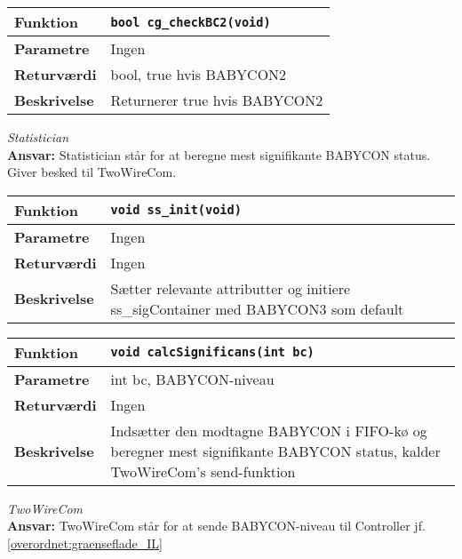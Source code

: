 \begin{center}
    \begin{tabular}{ | l | p{} |}
    \hline
    \textbf{Funktion}	& \verb+bool cg_checkBC2(void) +						\\ \hline
    \textbf{Parametre} 	& Ingen 								\\ \hline
    \textbf{Returværdi}	& bool, true hvis BABYCON2 	 								\\ \hline
    \textbf{Beskrivelse}& Returnerer true hvis BABYCON2		\\ \hline
    \end{tabular}
\end{center}



\textit{Statistician} \\
\textbf{Ansvar:} Statistician står for at beregne mest signifikante BABYCON status. Giver besked til TwoWireCom. 

\begin{center}
    \begin{tabular}{ | l | p{} |}
    \hline
    \textbf{Funktion}	& \verb+void ss_init(void) +						\\ \hline
    \textbf{Parametre} 	& Ingen		\\ \hline
    \textbf{Returværdi}	& Ingen	 								\\ \hline
    \textbf{Beskrivelse}& Sætter relevante attributter og initiere ss\_sigContainer med BABYCON3 som default	\\ \hline
    \end{tabular}
\end{center}

\begin{center}
    \begin{tabular}{ | l | p{} |}
    \hline
    \textbf{Funktion}	& \verb+void calcSignificans(int bc) +						\\ \hline
    \textbf{Parametre} 	& int bc, BABYCON-niveau		\\ \hline
    \textbf{Returværdi}	& Ingen	 								\\ \hline
    \textbf{Beskrivelse}& Indsætter den modtagne BABYCON i FIFO-kø og beregner mest signifikante BABYCON status, kalder TwoWireCom's send-funktion		\\ \hline
    \end{tabular}
\end{center}


\textit{TwoWireCom} \\
\textbf{Ansvar:} TwoWireCom står for at sende BABYCON-niveau til Controller jf. \ref{overordnet:graenseflade_IL}

